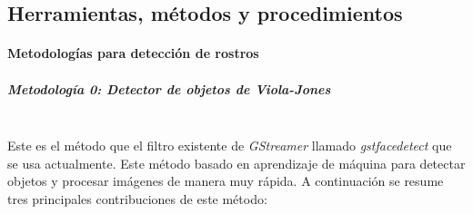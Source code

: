 \documentclass[a4paper,openright,12pt]{report}
\begin{document}
\subsection{Herramientas, métodos y procedimientos}

\paragraph{Metodologías para detección de rostros}
\subparagraph{Metodología 0: Detector de objetos de Viola-Jones}\mbox{} \\
Este es el método que el filtro existente de \textit{GStreamer} llamado
\textit{gstfacedetect} que se usa actualmente. Este método basado en aprendizaje
de máquina para detectar objetos y procesar imágenes de manera muy rápida. A
continuación se resume tres principales contribuciones de este método:
\end{document}

